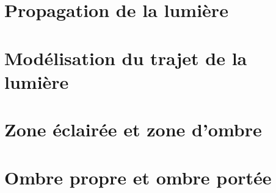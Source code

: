 \documentclass[12pt,a4paper]{article}
\date{}
\title{}
\begin{document}
	
	

\section{Propagation de la lumière}







%

\section{Modélisation du trajet de la lumière}





%	
%			
%	


\section{Zone éclairée et zone d'ombre}





%

\section{Ombre propre et ombre portée}








\end{document}
